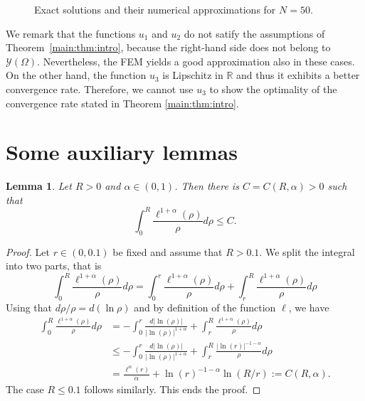 \documentclass[11 pt]{article}
\newtheorem{lemma}[theorem]{Lemma}
\numberwithin{equation}{section}
\def\R{\mathbb{R}}
\begin{document}
\begin{figure}[h!]
{
	} 
	\caption{Exact solutions and their numerical approximations for $N=50$.}
	\label{fig:comp_sol}
\end{figure}

We remark that the functions $u_1$ and $u_2$ do not satify the assumptions of Theorem~\ref{main:thm:intro}, because the right-hand side does not belong to $\mathcal Y(\Omega)$. Nevertheless, the FEM yields a good approximation also in these cases.  On the other hand, the function $u_3$ is Lipschitz in $\R$ and thus it exhibits a better convergence rate. Therefore, we cannot use $u_3$ to show the optimality of the convergence rate stated in Theorem \ref{main:thm:intro}.


\appendix

\section{Some auxiliary lemmas}
%
\begin{lemma}\label{lem:over}
Let $R>0$ and $\alpha\in(0,1)$. Then there is $C=C(R,\alpha)>0$ such that 
%
\begin{equation}
    \int_0^{R} \frac{\ell^{1+\alpha}(\rho)}{\rho}d\rho\leq C.
\end{equation}
%
\end{lemma}
%
\begin{proof}
Let $r\in(0,0.1)$ be fixed and assume that $R>0.1$. We split the integral into two parts, that is
%
\begin{equation*}
    \int_{0}^{R}\frac{\ell^{1+\alpha}(\rho)}{\rho}d\rho=\int_{0}^{r} \frac{\ell^{1+\alpha}(\rho)}{\rho}d\rho + \int_{r}^{R}\frac{\ell^{1+\alpha}(\rho)}{\rho}d\rho
\end{equation*}
%
Using that $d\rho/\rho=d(\ln \rho)$ and by definition of the function $\ell$, we have
%
\begin{align*}
    \int_{0}^{R}\frac{\ell^{1+\alpha}(\rho)}{\rho}d\rho &=-\int_{0}^{r} \frac{d|\ln(\rho)|}{|\ln(\rho)|^{1+\alpha}} + \int_{r}^{R}\frac{\ell^{1+\alpha}(\rho)}{\rho}d\rho 
    \\ &\leq -\int_{0}^{r} \frac{d|\ln(\rho)|}{|\ln(\rho)|^{1+\alpha}} + \int_{r}^{R}\frac{|\ln(r)|^{-1-\alpha}}{\rho}d\rho \\
    &=\frac{\ell^\alpha(r)}{\alpha}+\ln(r)^{-1-\alpha}\ln(R/r):=C(R,\alpha).
\end{align*}
%
The case $R\leq 0.1$ follows similarly. This ends the proof. 
\end{proof}
\end{document}
